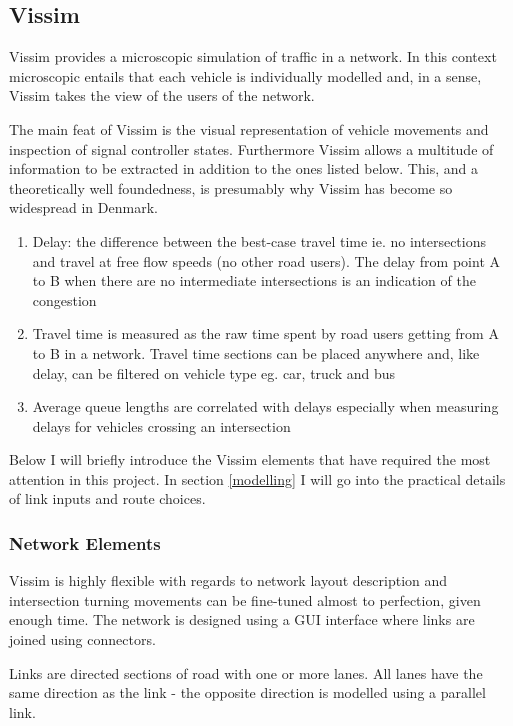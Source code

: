\subsection{Vissim}
\label{vissim}
Vissim provides a microscopic simulation of traffic in a network. In this context microscopic entails that each vehicle is individually modelled and, in a sense, Vissim takes the view of the users of the network.

The main feat of Vissim is the visual representation of vehicle movements and inspection of signal controller states. Furthermore Vissim allows a multitude of information to be extracted in addition to the ones listed below. This, and a theoretically well foundedness, is presumably why Vissim has become so widespread in Denmark.

\begin{enumerate}
\item Delay: the difference between the best-case travel time ie. no intersections and travel at free flow speeds (no other road users). The delay from point A to B when there are no intermediate intersections is an indication of the congestion
\item Travel time is measured as the raw time spent by road users getting from A to B in a network. Travel time sections can be placed anywhere and, like delay, can be filtered on vehicle type eg. car, truck and bus
\item Average queue lengths are correlated with delays especially when measuring delays for vehicles crossing an intersection
\end{enumerate}

Below I will briefly introduce the Vissim elements that have required the most attention in this project. In section \ref{modelling} I will go into the practical details of link inputs and route choices.

\subsubsection*{Network Elements}

Vissim is highly flexible with regards to network layout description and intersection turning movements can be fine-tuned almost to perfection, given enough time. The network is designed using a GUI interface where links are joined using connectors.

Links are directed sections of road with one or more lanes. All lanes have the same direction as the link - the opposite direction is modelled using a parallel link.

